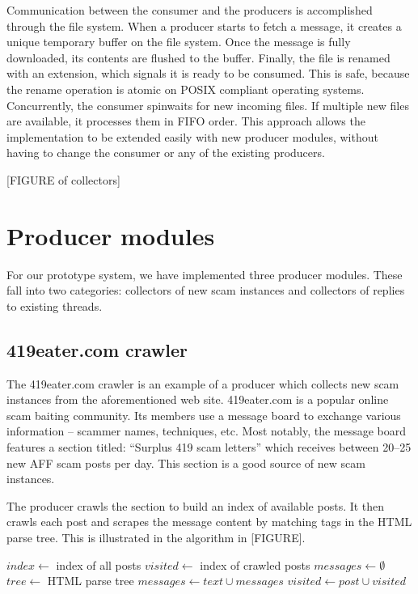 Communication between the consumer and the producers is accomplished through the file system. When a producer starts to fetch a message, it creates a unique temporary buffer on the file system. Once the message is fully downloaded, its contents are flushed to the buffer. Finally, the file is renamed with an extension, which signals it is ready to be consumed. This is safe, because the rename operation is atomic on POSIX compliant operating systems. Concurrently, the consumer spinwaits for new incoming files. If multiple new files are available, it processes them in FIFO order. This approach allows the implementation to be extended easily with new producer modules, without having to change the consumer or any of the existing producers. 

[FIGURE of collectors]

\section{Producer modules}
For our prototype system, we have implemented three producer modules. These fall into two categories: collectors of new scam instances and collectors of replies to existing threads.

\subsection{419eater.com crawler}
The 419eater.com crawler is an example of a producer which collects new scam instances from the aforementioned web site. 419eater.com is a popular online scam baiting community. Its members use a message board to exchange various information -- scammer names, techniques, etc. Most notably, the message board features a section titled: ``Surplus 419 scam letters'' which receives between 20--25 new AFF scam posts per day. This section is a good source of new scam instances.

The producer crawls the section to build an index of available posts. It then crawls each post and scrapes the message content by matching tags in the HTML parse tree. This is illustrated in the algorithm in [FIGURE].

\begin{algorithmic}
\State $index\gets $ index of all posts
\State $visited\gets $ index of crawled posts
\State $messages\gets \emptyset$ 
	\State $tree \gets $ HTML parse tree
			\State $messages \gets text \cup messages$ 
		\EndIf
	\EndFor
	\State $visited \gets post \cup visited$
\EndFor
\end{algorithmic}

